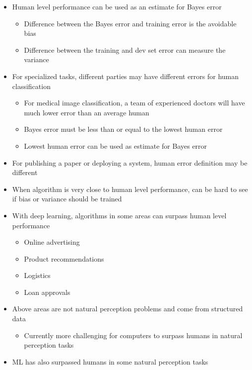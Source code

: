 \documentclass[12pt, letterpaper]{article}
\begin{document}
\begin{itemize}
        \item Human level performance can be used as an estimate for Bayes error
        \begin{itemize}
            \item Difference between the Bayes error and training error is the avoidable bias
            \item Difference between the training and dev set error can measure the variance
        \end{itemize}
        \item For specialized tasks, different parties may have different errors for human classification
        \begin{itemize}
            \item For medical image classification, a team of experienced doctors will have much lower error than an average human
            \item Bayes error must be less than or equal to the lowest human error
            \item Lowest human error can be used as estimate for Bayes error 
        \end{itemize}
        \item For publishing a paper or deploying a system, human error definition may be different
        \item When algorithm is very close to human level performance, can be hard to see if bias or variance should be trained
        \item With deep learning, algorithms in some areas can surpass human level performance
        \begin{itemize}
            \item Online advertising
            \item Product recommendations
            \item Logistics
            \item Loan approvals 
        \end{itemize}
        \item Above areas are not natural perception problems and come from structured data
        \begin{itemize}
            \item Currently more challenging for computers to surpass humans in natural perception tasks
        \end{itemize}
        \item ML has also surpassed humans in some natural perception tasks
        \begin{itemize}

\end{itemize}
\end{itemize}
\end{document}
